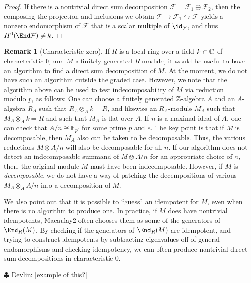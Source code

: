 \documentclass[12pt]{article}
\def\cF{\mathcal F}
\def\FF{\mathbb F}
\let\inc\hookrightarrow
\theoremstyle{theorem}
\numberwithin{thm}{section}
\theoremstyle{definition}
\newtheorem{rem}[thm]{Remark}
\newcommand{\devlin}[1]{{\color{red} \sf $\clubsuit$ Devlin: [#1]}}
\begin{document}
\begin{proof}
If there is a nontrivial direct sum decomposition $\cF = \cF_1\oplus \cF_2$, then the composing the projection and inclusions we obtain $\cF\to \cF_1\inc \cF$ yields a nonzero endomorphism of $\cF$ that is a scalar multiple of $\id_\cF$, and thus $H^0(\End \cF) \neq k$.
\end{proof}

\begin{rem}[Characteristic zero]
If $R$ is a local ring over a field $k\subset \mathbb C$ of characteristic 0, and $M$ a finitely generated $R$-module, it would be useful to have an algorithm to find a direct sum decomposition of $M$.
At the moment, we do not have such an algorithm outside the graded case.
However, we note that the algorithm above can be used to test indecomposability of $M$ via reduction modulo $p$, as follows:
One can choose a finitely generated $\mathbb Z$-algebra $A$ and an $A$-algebra $R_A$ such that $R_A\otimes _A k=R$, and likewise an $R_A$-module $M_A$ such that $M_A\otimes _A k = R$ and such that $M_A$ is flat over $A$. If $n$ is a maximal ideal of $A$, one can check that $A/n \cong \FF_{p^e}$ for some prime $p$ and $e$.
The key point is that if $M$ is decomposable, then $M_A$ also can be taken to be decomposable. Thus, the various reductions  $M\otimes A/n$ will also be decomposable for all $n$.
If our algorithm does not detect an indecomposable summand of $M\otimes A/n$ for an appropriate choice of $n$, then, the original module $M$ must have been indecomposable.
However, if $M$ is \emph{decomposable}, we do not have a way of patching the decompositions of various $M_A\otimes_A A/n$ into a decomposition of $M$.

We also point out that it is possible to ``guess'' an idempotent for $M$, even when there is no algorithm to produce one. In practice, if $M$ does have nontrivial idempotents, Macaulay2 often chooses them as some of the generators of $\End_R(M)$. By checking if the generators of $\End_R(M)$ are idempotent, and trying to construct idempotents by subtracting eigenvalues off of general endomorphisms and checking idempotency, we can often produce nontrivial direct sum decompositions in characteristic 0.

\devlin{example of this?}
\end{rem}
\end{document}
